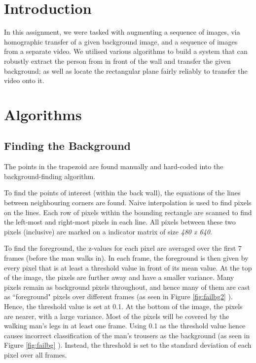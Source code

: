\documentclass[11pt]{article}
\title{\thetitle}
\author{\theauthor}
\date{}
\begin{document}
\maketitle
\thispagestyle{empty}

\section{Introduction}

In this assignment, we were tasked with augmenting a sequence of images, via homographic transfer of a given background image, and a sequence of images from a separate video. We utilised various algorithms to build a system that can robustly extract the person from in front of the wall and transfer the given background; as well as locate the rectangular plane fairly reliably to transfer the video onto it. 

\section{Algorithms}
\subsection{Finding the Background}
The points in the trapezoid are found manually and hard-coded into the background-finding algorithm. 

To find the points of interest (within the back wall), the equations of the lines between neighbouring corners are found. Naive interpolation is used to find pixels on the lines. Each row of pixels within the bounding rectangle are scanned to find the left-most and right-most pixels in each line. All pixels between these two pixels (inclusive) are marked on a indicator matrix of size \emph{480 x 640}. 

To find the foreground, the z-values for each pixel are averaged over the first 7 frames (before the man walks in). In each frame, the foreground is then given by every pixel that is at least a threshold value in front of its mean value. At the top of the image, the pixels are further away and have a smaller variance. Many pixels remain as background pixels throughout, and hence many of them are cast as ``foreground" pixels over different frames (as seen in Figure \ref{fig:failbg2} ). Hence, the threshold value is set at 0.1. At the bottom of the image, the pixels are nearer, with a large variance. Most of the pixels will be covered by the walking man's legs in at least one frame. Using 0.1 as the threshold value hence causes incorrect classification of the man's trousers as the background (as seen in Figure \ref{fig:failbg} ). Instead, the threshold is set to the standard deviation of each pixel over all frames. 
\end{document}
